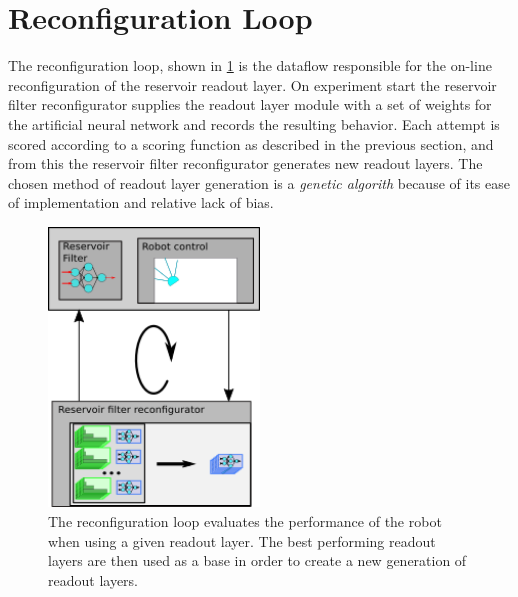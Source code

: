 \section{Reconfiguration Loop}
The reconfiguration loop, shown in \ref{figReconfLoop} is the dataflow
responsible for the on-line reconfiguration of the reservoir readout layer.
On experiment start the reservoir filter reconfigurator supplies the readout
layer module with a set of weights for the artificial neural network and records
the resulting behavior.
Each attempt is scored according to a scoring function as described in the
previous section, and from this the reservoir filter reconfigurator generates
new readout layers.
The chosen method of readout layer generation is a \emph{genetic algorith}
because of its ease of implementation and relative lack of bias.
\begin{figure}[h!]
  \centering
  \includegraphics[width=0.5\textwidth]{fig/reconfigLoop.png}
  \caption{
    The reconfiguration loop evaluates the performance of the robot when using a
    given readout layer.
    The best performing readout layers are then used as a base in order to
    create a new generation of readout layers.
  }
  \label{figReconfLoop}
\end{figure}
\cleardoublepage

